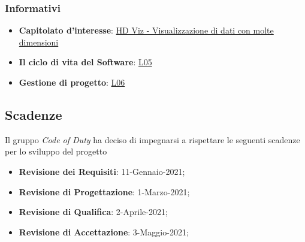 	\subsubsection{Informativi}
		\begin{itemize}
			\item \textbf{Capitolato d'interesse}: \href{https://www.math.unipd.it/~tullio/IS-1/2020/Progetto/C4.pdf}{HD Viz - Visualizzazione di dati con molte dimensioni}
			\item \textbf{Il ciclo di vita del Software}: \href{https://www.math.unipd.it/~tullio/IS-1/2020/Dispense/L05.pdf}{L05}
			\item \textbf{Gestione di progetto}: \href{https://www.math.unipd.it/~tullio/IS-1/2020/Dispense/L06.pdf}{L06}
		\end{itemize}
\subsection{Scadenze}
	Il gruppo \textit{Code of Duty} ha deciso di impegnarsi a rispettare le seguenti scadenze per lo sviluppo del progetto \hd
	\begin{itemize}
		\item \textbf{Revisione dei Requisiti}: 11-Gennaio-2021;
		\item \textbf{Revisione di Progettazione}: 1-Marzo-2021;
		\item \textbf{Revisione di Qualifica}: 2-Aprile-2021;
		\item \textbf{Revisione di Accettazione}: 3-Maggio-2021;
	\end{itemize}
